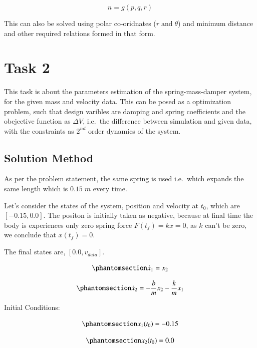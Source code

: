 \documentclass[
  number,
  preprint]{elsarticle}
\begin{document}
\[
n = g(p, q, r)
\]

This can also be solved using polar co-oridnates
(\(r \; \text{and} \; \theta\)) and minimum distance and other required
relations formed in that form.

\pagebreak

\section{Task 2}\label{sec-task2}

This task is about the parameters estimation of the spring-mass-damper
system, for the given mass and velocity data. This can be posed as a
optimization problem, such that design varibles are damping and spring
coefficients and the obejective function as \(\Delta V\), i.e.~the
difference between simulation and given data, with the constraints as
\(2^{nd}\) order dynamics of the system.

\subsection{Solution Method}\label{solution-method}

As per the problem statement, the same spring is used i.e.~which expands
the same length which is \(0.15 \; m\) every time.

Let's consider the states of the system, position and velocity at
\(t_0\), which are \([-0.15, 0.0]\). The positon is initially taken as
negative, because at final time the body is experiences only zero spring
force \(F(t_f) = kx =0\), as \(k\) can't be zero, we conclude that
\(x(t_f)=0\).

The final states are, \([0.0, v_{data}]\).

\begin{equation}\protect\phantomsection\label{eq-x1}{
\dot{x}_1 = x_2
}\end{equation}

\begin{equation}\protect\phantomsection\label{eq-x2}{
\dot{x}_2 = -\frac{b}{m}x_2 - \frac{k}{m}x_1
}\end{equation}

Initial Conditions:

\begin{equation}\protect\phantomsection\label{eq-bc-x1}{
x_1(t_0) = -0.15
}\end{equation}

\begin{equation}\protect\phantomsection\label{eq-bc-x2}{
x_2(t_0) = 0.0
}\end{equation}
\end{document}
